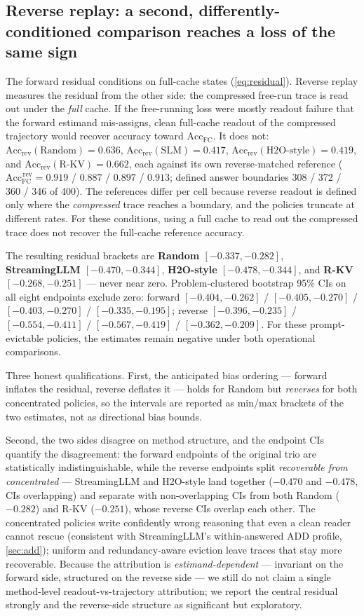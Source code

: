\documentclass{article}
\newcommand{\accfc}{\mathrm{Acc}_{\mathrm{FC}}}
\newcommand{\accrev}[1]{\mathrm{Acc}_{\mathrm{rev}}(#1)}
\begin{document}
\subsection{Reverse replay: a second, differently-conditioned comparison reaches a loss of the same sign}
\label{sec:reverse}
The forward residual conditions on full-cache states (\cref{eq:residual}). Reverse replay measures the residual from the other side: the compressed free-run trace is read out under the \emph{full} cache. If the free-running loss were mostly readout failure that the forward estimand mis-assigns, clean full-cache readout of the compressed trajectory would recover accuracy toward $\accfc$. It does not: $\accrev{\text{Random}} = 0.636$, $\accrev{\text{SLM}} = 0.417$, $\accrev{\text{H2O-style}} = 0.419$, and $\accrev{\text{R-KV}} = 0.662$, each against its own reverse-matched reference ($\accfc^{\,\mathrm{rev}} = 0.919$ / $0.887$ / $0.897$ / $0.913$; defined answer boundaries 308 / 372 / 360 / 346 of 400). The references differ per cell because reverse readout is defined only where the \emph{compressed} trace reaches a boundary, and the policies truncate at different rates. For these conditions, using a full cache to read out the compressed trace does not recover the full-cache reference accuracy.

The resulting residual brackets are \textbf{Random $[-0.337, -0.282]$}, \textbf{StreamingLLM $[-0.470, -0.344]$}, \textbf{H2O-style $[-0.478, -0.344]$}, and \textbf{R-KV $[-0.268, -0.251]$} --- never near zero. Problem-clustered bootstrap 95\% CIs on all eight endpoints exclude zero: forward $[-0.404, -0.262]$ / $[-0.405, -0.270]$ / $[-0.403, -0.270]$ / $[-0.335, -0.195]$; reverse $[-0.396, -0.235]$ / $[-0.554, -0.411]$ / $[-0.567, -0.419]$ / $[-0.362, -0.209]$. For these prompt-evictable policies, the estimates remain negative under both operational comparisons.

Three honest qualifications. First, the anticipated bias ordering --- forward inflates the residual, reverse deflates it --- holds for Random but \emph{reverses} for both concentrated policies, so the intervals are reported as min/max brackets of the two estimates, not as directional bias bounds.

Second, the two sides disagree on method structure, and the endpoint CIs quantify the disagreement: the forward endpoints of the original trio are statistically indistinguishable, while the reverse endpoints split \emph{recoverable from concentrated} --- StreamingLLM and H2O-style land together ($-0.470$ and $-0.478$, CIs overlapping) and separate with non-overlapping CIs from both Random ($-0.282$) and R-KV ($-0.251$), whose reverse CIs overlap each other. The concentrated policies write confidently wrong reasoning that even a clean reader cannot rescue (consistent with StreamingLLM's within-answered ADD profile, \cref{sec:add}); uniform and redundancy-aware eviction leave traces that stay more recoverable. Because the attribution is \emph{estimand-dependent} --- invariant on the forward side, structured on the reverse side --- we still do not claim a single method-level readout-vs-trajectory attribution; we report the central residual strongly and the reverse-side structure as significant but exploratory.
\end{document}
